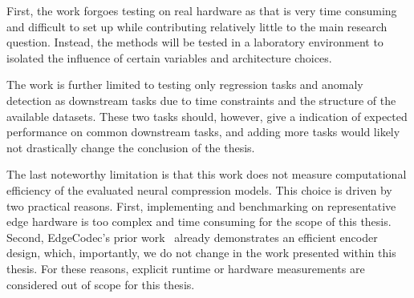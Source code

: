 First, the work forgoes testing on real hardware as that is very time consuming and difficult to set up while contributing relatively little to the main research question. Instead, the methods will be tested in a laboratory environment to isolated the influence of certain variables and architecture choices. 

The work is further limited to testing only regression tasks and anomaly detection as downstream tasks due to time constraints and the structure of the available datasets. These two tasks should, however, give a indication of expected performance on common downstream tasks, and adding more tasks would likely not drastically change the conclusion of the thesis. 

The last noteworthy limitation is that this work does not measure computational efficiency of the evaluated neural compression models. This choice is driven by two practical reasons. First, implementing and benchmarking on representative edge hardware is too complex and time consuming for the scope of this thesis. Second, EdgeCodec's prior work~\cite{Hodo2025} already demonstrates an efficient encoder design, which, importantly, we do not change in the work presented within this thesis. For these reasons, explicit runtime or hardware measurements are considered out of scope for this thesis.






